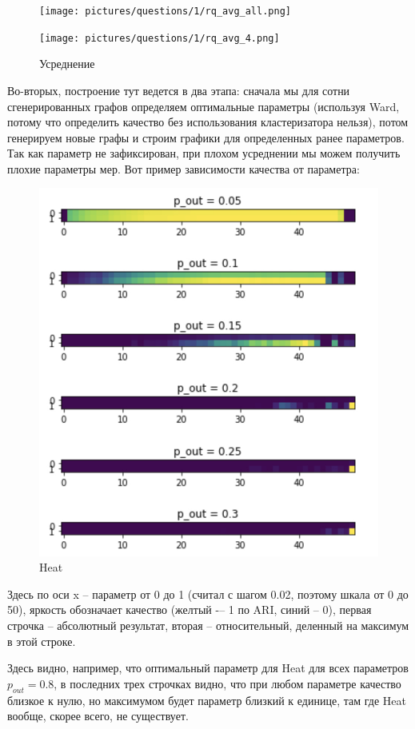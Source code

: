 \documentclass{article}
\begin{document}
\begin{figure}[H] %
	\begin{minipage}{.5\textwidth}
		\centerline{
			\texttt{[image: pictures/questions/1/rq\_avg\_all.png]}
		}
	\end{minipage}%
	\begin{minipage}{.5\textwidth}
		\centerline{
			\texttt{[image: pictures/questions/1/rq\_avg\_4.png]}
		}
	\end{minipage}%
\caption{\label{f_Rcur} Усреднение}
\end{figure}

Во-вторых, построение тут ведется в два этапа: сначала мы для сотни сгенерированных графов определяем оптимальные параметры (используя Ward, потому что определить качество без использования кластеризатора нельзя), потом генерируем новые графы и строим графики для определенных ранее параметров. Так как параметр не зафиксирован, при плохом усреднении мы можем получить плохие параметры мер. Вот пример зависимости качества от параметра:

\begin{figure}[H]
	\includegraphics[width=.5\linewidth]{pictures/questions/1/quality.jpeg}
	\caption{\label{f_vs2} Heat}
\end{figure}

Здесь по оси x -- параметр от 0 до 1 (считал с шагом 0.02, поэтому шкала от 0 до 50), яркость обозначает качество (желтый -– 1 по ARI, синий -- 0), первая строчка -- абсолютный результат, вторая – относительный, деленный на максимум в этой строке. 

Здесь видно, например, что оптимальный параметр для Heat для всех параметров $p_{out} = 0.8$, в последних трех строчках видно, что при любом параметре качество близкое к нулю, но максимумом будет параметр близкий к единице, там где Heat вообще, скорее всего, не существует.
\end{document}
